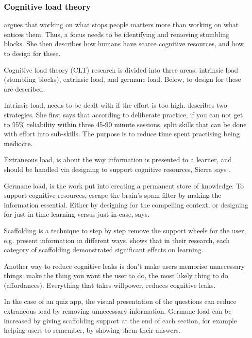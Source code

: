 \subsubsection{Cognitive load theory}

\cite{sierra} argues that working on what stops people matters more than working on what entices them. Thus, a focus needs to be identifying and removing stumbling blocks. She then describes how humans have scarce cognitive resources, and how to design for these.

Cognitive load theory (CLT) research is divided into three areas: intrinsic load (stumbling blocks), extrinsic load, and germane load. Below, to design for these are described.

Intrinsic load, needs to be dealt with if the effort is too high. \cite{sierra} describes two strategies. She first says that according to deliberate practice, if you can not get to 95\% reliability within three 45-90 minute sessions, split skills that can be done with effort into sub-skills. The purpose is to reduce time spent practising being mediocre.

Extraneous load, is about the way information is presented to a learner, and should be handled via designing to support cognitive resources, Sierra says \citep{sierra}.

Germane load, is the work put into creating a permanent store of knowledge. To support cognitive resources, escape the brain's spam filter by making the information essential. Either by designing for the compelling context, or designing for just-in-time learning versus just-in-case, \cite{sierra} says.

Scaffolding is a technique to step by step remove the support wheels for the user, e.g. present information in different ways. \cite{gates} shows that in their research, each category of scaffolding demonstrated significant effects on learning.

Another way to reduce cognitive leaks is don't make users memorise unnecessary things: make the thing you want the user to do, the most likely thing to do (affordances). Everything that takes willpower, reduces cognitive leaks.

In the case of an quiz app, the visual presentation of the questions can reduce extraneous load by removing unnecessary information. Germane load can be increased by giving scaffolding support at the end of each section, for example helping users to remember, by showing them their answers.

